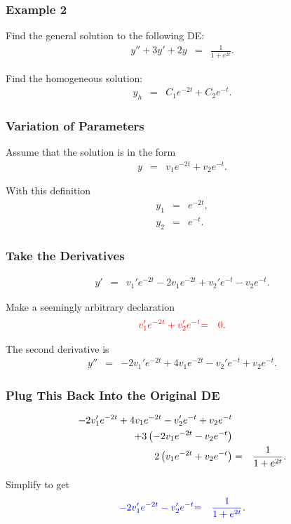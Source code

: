 \begin{frame}
  \frametitle{Example 2}
  Find the general solution to the following DE:
  \begin{eqnarray*}
          y'' + 3y' + 2y & = & \frac{1}{1+e^{2t}}.
  \end{eqnarray*}

  {
    Find the homogeneous solution:
    \begin{eqnarray*}
      y_h & = & C_1 e^{-2t} + C_2 e^{-t}.
    \end{eqnarray*}
  }

\end{frame}


\begin{frame}
  \frametitle{Variation of Parameters}

  Assume that the solution is in the form
  \begin{eqnarray*}
    y & = & v_1 e^{-2t} + v_2 e^{-t}.
  \end{eqnarray*}

  With this definition
  \begin{eqnarray*}
    y_1 & = & e^{-2t}, \\
    y_2 & = & e^{-t}.
  \end{eqnarray*}

\end{frame}

\begin{frame}
  \frametitle{Take the Derivatives}
  \begin{eqnarray*}
    y' & = & v_1'e^{-2t} -2 v_1 e^{-2t} + v_2' e^{-t} - v_2 e^{-t}.
  \end{eqnarray*}

  Make a seemingly arbitrary declaration
  \begin{eqnarray*}
    {\color{red}v_1'e^{-2t} + v_2' e^{-t}} & {\color{red}=} & {\color{red}0}.
  \end{eqnarray*}

  The second derivative is
  \begin{eqnarray*}
    y'' & = & -2 v_1' e^{-2t} + 4 v_1 e^{-2t} - v_2' e^{-t} + v_2 e^{-t}.
  \end{eqnarray*}
\end{frame}

\begin{frame}
  \frametitle{Plug This Back Into the Original DE}

  \begin{eqnarray*}
    -2 v_1' e^{-2t} + 4 v_1 e^{-2t} - v_2' e^{-t} + v_2 e^{-t} & & \\
    + 3 \left( -2 v_1 e^{-2t} - v_2 e^{-t} \right) & & \\
    2 \left( v_1 e^{-2t} + v_2 e^{-t} \right) & = & \frac{1}{1+e^{2t}}.
  \end{eqnarray*}

  Simplify to get
  \begin{eqnarray*}
    {\color{blue}-2 v_1' e^{-2t}  - v_2' e^{-t}} & {\color{blue}=} & {\color{blue}\frac{1}{1+e^{2t}}}.
  \end{eqnarray*}

\end{frame}

